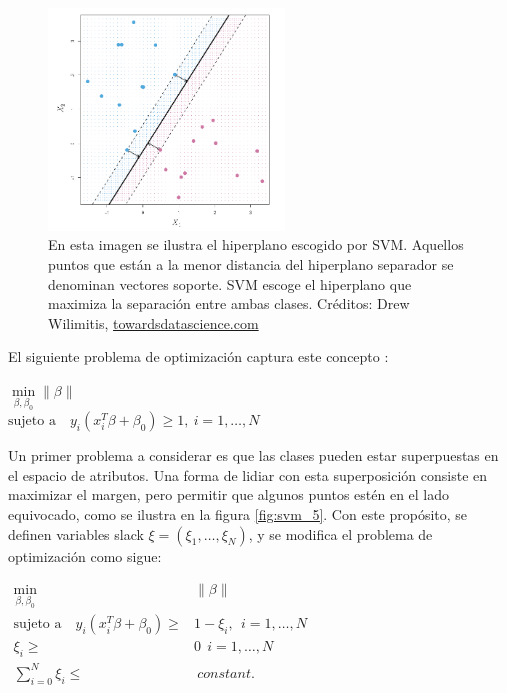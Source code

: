 \begin{figure}[h!]
\begin{center}
  \includegraphics[width=0.56\textwidth]{Kap1/svm3.png} 
  \end{center}
 \caption{En esta imagen se ilustra el hiperplano escogido por SVM. Aquellos puntos que están a la menor distancia del hiperplano separador se denominan vectores soporte. SVM escoge el hiperplano que maximiza la separación entre ambas clases. Créditos: Drew Wilimitis, \url{towardsdatascience.com}}
\label{fig:svm_3}
\end{figure}

El siguiente problema de optimización captura este concepto \cite{statisticallearning}:

\begin{center}
$\min\limits_{\beta, \beta_0}   \| \beta \|$\\
$\textrm{sujeto a} \quad  y_{i}(x_i^T \beta + \beta_0)
  \geq 1, \ i=1,\ldots,N$    \\
\end{center}

Un primer problema a considerar es que las clases pueden estar superpuestas en el espacio de atributos. Una forma de lidiar con esta superposición consiste en maximizar el margen, pero permitir que algunos puntos estén en el lado equivocado, como se ilustra en la figura \ref{fig:svm_5}. Con este propósito, se definen variables slack $\xi=(\xi_1, \ldots, \xi_N)$, y se modifica el problema de optimización como sigue:

\begin{center}
$\begin{aligned}
\min\limits_{\beta, \beta_0}  & \| \beta \| \\
\textrm{sujeto a} \quad  y_{i}(x_i^T \beta + \beta_0) 
  \geq& 1 - \xi_i, \ \  i=1,\ldots,N    \\
  \xi_i \geq& 0  \ \  i=1,\ldots,N    \\
  \sum\limits_{i=0}^N \xi_i \leq& \ constant.
\end{aligned}
$
\end{center}


